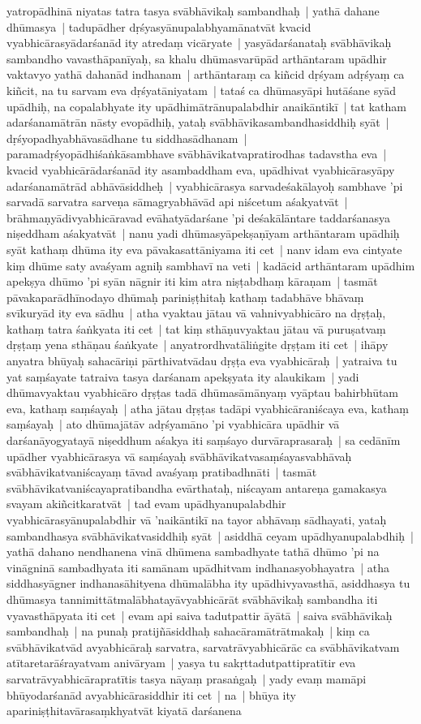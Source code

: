 \documentclass[article,12pt,a4paper]{memoir}%
\begin{document}
yatropādhinā niyatas tatra tasya svābhāvikaḥ sambandhaḥ | yathā dahane dhūmasya | tadupādher dṛśyasyānupalabhyamānatvāt kvacid vyabhicārasyādarśanād ity atredaṃ vicāryate | yasyādarśanataḥ svābhāvikaḥ sambandho vavasthāpanīyaḥ, sa khalu dhūmasvarūpād arthāntaram upādhir vaktavyo yathā dahanād indhanam | arthāntaraṃ ca kiñcid dṛśyam adṛśyaṃ ca kiñcit, na tu sarvam eva dṛśyatāniyatam | tataś ca dhūmasyāpi hutāśane syād upādhiḥ, na copalabhyate ity upādhimātrānupalabdhir anaikāntikī | tat katham adarśanamātrān nāsty evopādhiḥ, yataḥ svābhāvikasambandhasiddhiḥ syāt | dṛśyopadhyabhāvasādhane tu siddhasādhanam | paramadṛśyopādhiśaṅkāsambhave svābhāvikatvapratirodhas tadavstha eva | kvacid vyabhicārādarśanād ity asambaddham eva, upādhivat vyabhicārasyāpy adarśanamātrād abhāvāsiddheḥ | vyabhicārasya sarvadeśakālayoḥ sambhave 'pi sarvadā sarvatra sarveṇa sāmagryabhāvād api niścetum aśakyatvāt | brāhmaṇyādivyabhicāravad evāhatyādarśane 'pi deśakālāntare taddarśanasya niṣeddham aśakyatvāt | \label{thakur75-110.7} nanu yadi dhūmasyāpekṣaṇīyam arthāntaram upādhiḥ syāt kathaṃ dhūma ity eva pāvakasattāniyama iti cet | nanv idam eva cintyate kiṃ dhūme saty avaśyam agniḥ sambhavī na veti | kadācid arthāntaram upādhim apekṣya dhūmo 'pi syān nāgnir iti kim atra niṣṭabdhaṃ kāraṇam | tasmāt pāvakaparādhīnodayo dhūmaḥ pariniṣṭhitaḥ kathaṃ tadabhāve bhāvaṃ svīkuryād ity eva sādhu | \label{thakur75-110.12} atha vyaktau jātau vā vahnivyabhicāro na dṛṣṭaḥ, kathaṃ tatra śaṅkyata iti cet | tat kiṃ sthāṇuvyaktau jātau vā puruṣatvaṃ dṛṣṭaṃ yena sthāṇau śaṅkyate | anyatrordhvatāliṅgite dṛṣṭam iti cet | ihāpy anyatra bhūyaḥ sahacāriṇi pārthivatvādau dṛṣṭa eva vyabhicāraḥ | yatraiva tu yat saṃśayate tatraiva tasya darśanam apekṣyata ity alaukikam | yadi dhūmavyaktau vyabhicāro dṛṣṭas tadā dhūmasāmānyaṃ vyāptau bahirbhūtam eva, kathaṃ saṃśayaḥ | atha jātau dṛṣṭas tadāpi vyabhicāraniścaya eva, kathaṃ saṃśayaḥ | ato dhūmajātāv adṛśyamāno 'pi vyabhicāra upādhir vā darśanāyogyatayā niṣeddhum aśakya iti saṃśayo durvāraprasaraḥ | sa cedānīm upādher vyabhicārasya vā saṃśayaḥ svābhāvikatvasaṃśayasvabhāvaḥ svābhāvikatvaniścayaṃ tāvad avaśyaṃ pratibadhnāti | tasmāt svābhāvikatvaniścayapratibandha evārthataḥ, niścayam antareṇa gamakasya svayam akiñcitkaratvāt | tad evam upādhyanupalabdhir vyabhicārasyānupalabdhir vā 'naikāntikī na tayor abhāvaṃ sādhayati, yataḥ sambandhasya svābhāvikatvasiddhiḥ syāt | asiddhā ceyam upādhyanupalabdhiḥ | yathā dahano nendhanena vinā dhūmena sambadhyate tathā dhūmo 'pi na vināgninā sambadhyata iti samānam upādhitvam indhanasyobhayatra | \label{thakur75-110.26} atha siddhasyāgner indhanasāhityena dhūmalābha ity upādhivyavasthā, asiddhasya tu dhūmasya tannimittātmalābhatayāvyabhicārāt svābhāvikaḥ sambandha iti vyavasthāpyata iti cet | evam api saiva tadutpattir āyātā | saiva svābhāvikaḥ sambandhaḥ | na punaḥ pratijñāsiddhaḥ sahacāramātrātmakaḥ | kiṃ ca svābhāvikatvād avyabhicāraḥ sarvatra, sarvatrāvyabhicārāc ca svābhāvikatvam atītaretarāśrayatvam anivāryam | yasya tu sakṛttadutpattipratītir eva sarvatrāvyabhicārapratītis tasya nāyaṃ prasaṅgaḥ | \label{thakur75-110.32} yady evaṃ mamāpi bhūyodarśanād avyabhicārasiddhir iti cet | na | bhūya ity apariniṣṭhitavārasaṃkhyatvāt kiyatā darśanena 
\end{document}
